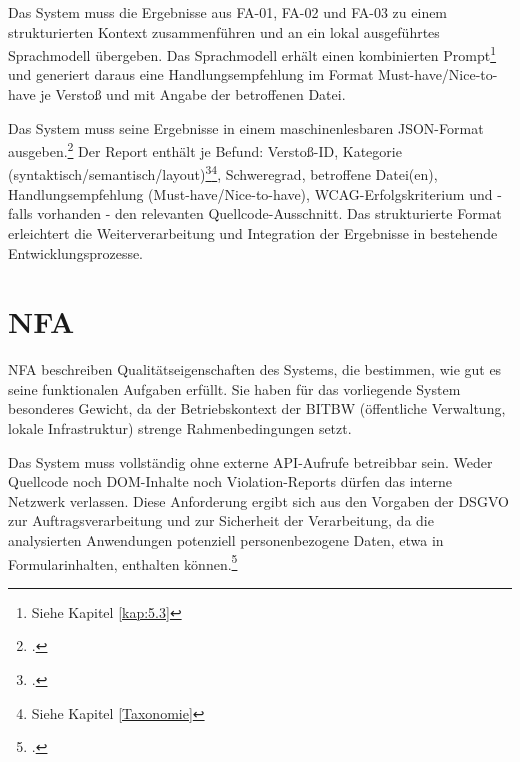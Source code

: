 
Das System muss die Ergebnisse aus \ac{FA}-01, \ac{FA}-02 und \ac{FA}-03 zu einem strukturierten Kontext zusammenführen und an ein lokal ausgeführtes Sprachmodell übergeben. Das Sprachmodell erhält einen kombinierten Prompt\footnote{Siehe Kapitel \ref{kap:5.3}} und generiert daraus eine Handlungsempfehlung im Format Must-have/Nice-to-have je Verstoß und mit Angabe der betroffenen Datei.


Das System muss seine Ergebnisse in einem maschinenlesbaren \acs{JSON}-Format ausgeben.\footcite[Vgl.][]{paterno_how_2025,pool_testaro_2023} Der Report enthält je Befund: Verstoß-ID, Kategorie (syntaktisch/semantisch/layout)\footcite[Vgl.][]{fathallah_accessguru_2025}\footnote{Siehe Kapitel \ref{Taxonomie}}, Schweregrad, betroffene Datei(en), Handlungsempfehlung (Must-have/Nice-to-have), \ac{WCAG}-Erfolgs\-kri\-terium und - falls vorhanden - den relevanten Quellcode-Ausschnitt. Das strukturierte For\-mat erleichtert die Weiterverarbeitung und Integration der Ergebnisse in bestehende Entwicklungsprozesse.

\section{\acf{NFA}}\label{kap:4.3}

\acf{NFA} beschreiben Qualitätseigenschaften des Systems, die bestimmen, wie gut es seine funktionalen Aufgaben erfüllt. Sie haben für das vorliegende System besonderes Gewicht, da der Betriebskontext der \ac{BITBW} (öffentliche Verwaltung, lokale Infrastruktur) strenge Rahmenbedingungen setzt.


Das System muss vollständig ohne externe \ac{API}-Aufrufe betreibbar sein. Weder Quellcode noch \ac{DOM}-Inhalte noch Violation-Reports dürfen das interne Netzwerk verlassen. Diese Anforderung ergibt sich aus den Vorgaben der \ac{DSGVO} zur Auftragsverarbeitung und zur Sicherheit der Verarbeitung, da die analysierten Anwendungen potenziell personenbezogene Daten, etwa in Formularinhalten, enthalten können.\footcite[Vgl.][Art. 28 und Art. 32]{dsgvo2016}


